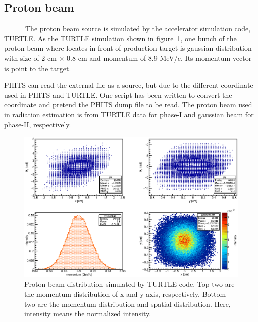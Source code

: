  \subsection{Proton beam}
~~~~~~The proton beam source is simulated by the accelerator simulation code, TURTLE.
As the TURTLE simulation shown in figure~\ref{beam}, one bunch of the proton beam where locates in front of production target is gaussian distribution with size of 2 cm $\times$ 0.8 cm and momentum of 8.9 MeV/c.
Its momentum vector is point to the target.

PHITS can read the external file as a source, but due to the different coordinate used in PHITS and TURTLE.
One script has been written to convert the coordinate and pretend the PHITS dump file to be read. 
The proton beam used in radiation estimation is from TURTLE data for phase-I and gaussian beam for phase-II, respectively.
\begin{figure}[H]
 \centering
 \includegraphics[scale=0.6]{chapter3/fig/beam.eps}
 \caption{Proton beam distribution simulated by TURTLE code. Top two are the momentum distribution of x and y axis, respectively. Bottom two are the momentum distribution and spatial distribution. Here, intensity means the normalized intensity.}
 \label{beam}
\end{figure}
 

